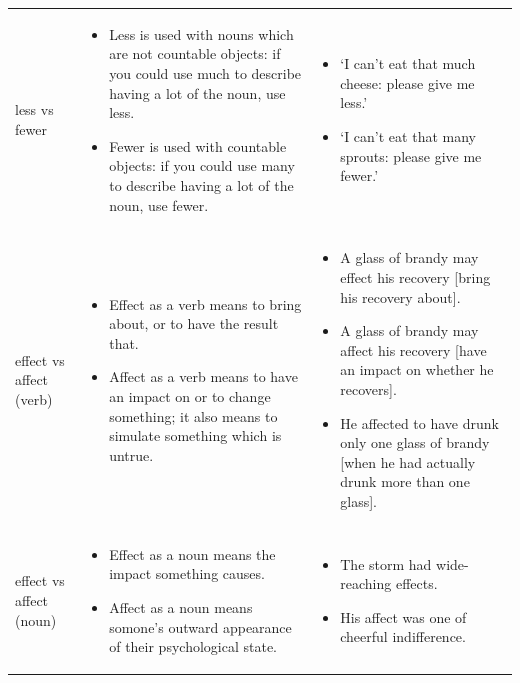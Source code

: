 \documentclass[11pt,a4paper]{book}
\begin{document}
{\begin{longtable}{p{1.5cm} | p{4.75cm} | p{4.75cm}}
	 			
	 			\noindent \mbox{less} vs \mbox{fewer} &
				\begin{itemize}[noitemsep,topsep=0pt,partopsep=0pt]
	 				\item Less is used with nouns which are not countable objects: if you could use much to describe having a lot of the noun, use less.
	 				\item Fewer is used with countable objects: if you could use many to describe having a lot of the noun, use fewer.
	 			\end{itemize} & 
				\begin{itemize}[noitemsep,topsep=0pt,partopsep=0pt]
	 				\item `I can't eat that much cheese: please give me less.'
	 				\item `I can't eat that many sprouts: please give me fewer.'
	 			\end{itemize} \\ 
		 		
		 		
		 		\noindent 
		 		\mbox{effect} vs \mbox{affect} (verb) &
		 		\begin{itemize}[noitemsep,leftmargin=*,topsep=0pt,partopsep=0pt]
		 			\item Effect as a verb means to bring about, or to have the result that.
		 			\item Affect as a verb means to have an impact on or to change something; it also means to simulate something which is untrue.
		 		\end{itemize}  & 
		 		\begin{itemize}[noitemsep,leftmargin=*,topsep=0pt,partopsep=0pt]
		 			\item A glass of brandy may effect his recovery [bring his recovery about].
		 			\item A glass of brandy may affect his recovery [have an impact on whether he recovers].
		 			\item He affected to have drunk only one glass of brandy [when he had actually drunk more than one glass].
		 		\end{itemize} \\ 
		 		
		 		\noindent 
		 		\mbox{effect} vs \mbox{affect} (noun)
		 		 &
		 		\begin{itemize}[noitemsep,leftmargin=*,topsep=0pt,partopsep=0pt]
		 			\item Effect as a noun means the impact something causes.
		 			\item Affect as a noun means somone's outward appearance of their psychological state.
		 		\end{itemize}  & 
		 		\begin{itemize}[noitemsep,leftmargin=*,topsep=0pt,partopsep=0pt]
		 			\item The storm had wide-reaching effects.
		 			\item His affect was one of cheerful indifference.
		 		\end{itemize} \\ 
		 		

\end{longtable}}
\end{document}
